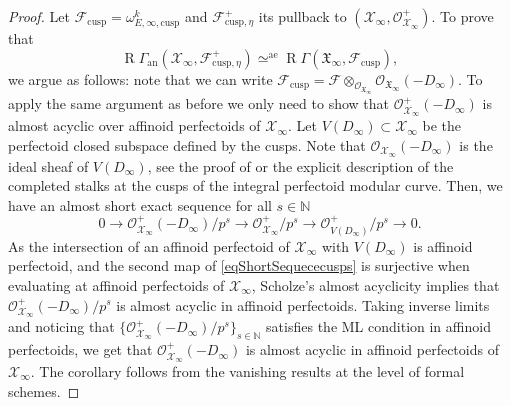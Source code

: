 \documentclass[JEP,XML,SOM,Unicode,published]{cedram}
\newcommand{\rae}{\mathrm{ae}}
\newcommand{\an}{\mathrm{an}}
\newcommand{\cusp}{\mathrm{cusp}}
\numberwithin{equation}{section}
\theoremstyle{definition}
\newcommand{\bb}[1]{\mathbb{#1}}
\newcommand{\n}[1]{\mathcal{#1}}
\newcommand{\f}[1]{\mathfrak{#1}}
\newcommand{\s}[1]{\mathscr{#1}}
\DeclareMathOperator{\R}{R}
\begin{document}
\begin{proof}
Let $\n{F}_{\cusp}=\omega_{E,\infty,\cusp}^{k}$ and $\n{F}^+_{\cusp, \eta}$ its pullback to $(\n{X}_{\infty}, \s{O}^+_{\n{X}_{\infty}})$. To prove that
\[
\R\Gamma_{\an}(\n{X}_{\infty}, \n{F}^+_{\cusp,\eta}) \simeq^{\rae} \R\Gamma(\f{X}_{\infty}, \n{F}_{\cusp}),
\]
we argue as follows: note that we can write $\n{F}_{\cusp}= \n{F}\otimes_{\s{O}_{\f{X}_{\infty}}} \s{O}_{\f{X}_{\infty}}(-D_{\infty})$. To apply the same argument as before we only need to show that $\s{O}_{\n{X}_{\infty}}^+(-D_{\infty})$ is almost acyclic over affinoid perfectoids of $\n{X}_{\infty}$. Let $V(D_{\infty})\subset \n{X}_{\infty}$ be the perfectoid closed subspace defined by the cusps. Note that $\s{O}_{\n{X}_{\infty}}(-D_\infty)$ is the ideal sheaf of $V(D_{\infty})$, see the proof of \cite[Th.\,IV.2.1]{scholzeTorsCoho2015} or the explicit description of the completed stalks at the cusps of the integral perfectoid modular curve. Then, we have an almost short exact sequence for all $s\in \bb{N}$
\begin{equation}
\label{eqShortSequececusps}
0\to \s{O}^+_{\n{X}_{\infty}}(-D_{\infty})/p^s \to \s{O}^+_{\n{X}_{\infty}}/p^s \to \s{O}^+_{V(D_{\infty})}/p^s \to 0.
\end{equation}
As the intersection of an affinoid perfectoid of $\n{X}_{\infty}$ with $V(D_{\infty})$ is affinoid perfectoid, and the second map of \eqref{eqShortSequececusps} is surjective when evaluating at affinoid perfectoids of $\n{X}_{\infty}$, Scholze's almost acyclicity implies that $\s{O}^+_{\n{X}_{\infty}}(-D_{\infty})/p^s$ is almost acyclic in affinoid perfectoids. Taking inverse limits and noticing that $\{\s{O}^+_{\n{X}_{\infty}}(-D_{\infty})/p^s \}_{s\in \bb{N}}$ satisfies the ML condition in affinoid perfectoids, we get that $\s{O}^+_{\n{X}_{\infty}}(-D_{\infty})$ is almost acyclic in affinoid perfectoids of $\n{X}_{\infty}$. The corollary follows from the vanishing results at the level of formal schemes.
\end{proof}
\end{document}
